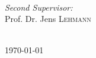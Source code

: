 \begin{titlepage}
\begin{minipage}{0.3\textwidth}
\begin{flushleft} \large
\end{flushleft}
\end{minipage}
~
\begin{minipage}{0.6\textwidth}
\begin{flushright} \large
\emph{Second Supervisor:} \\
 
Prof. Dr. Jens \textsc{Lehmann} %
\end{flushright}
\end{minipage}
\\[7cm]



{\large \today} %


 

\vfill %

\end{titlepage}